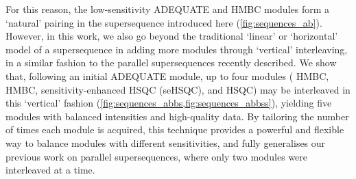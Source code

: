 \documentclass[a4paper,12pt]{article}
\newcommand{\carbon}{\ch{^{13}C}}
\newcommand{\nitrogen}{\ch{^{15}N}}
\begin{document}
\begin{refsection}
For this reason, the low-sensitivity ADEQUATE and \nitrogen{} HMBC modules form a `natural' pairing in the  supersequence introduced here (\cref{fig:sequences_ab}).
However, in this work, we also go beyond the traditional `linear' or `horizontal' model of a supersequence in adding more modules through `vertical' interleaving, in a similar fashion to the parallel supersequences recently described.\autocite{Kupce2021JACSA}
We show that, following an initial ADEQUATE module, up to four modules (\nitrogen{} HMBC, \carbon{} HMBC, \nitrogen{} sensitivity-enhanced HSQC (seHSQC), and \carbon{} HSQC) may be interleaved in this `vertical' fashion (\cref{fig:sequences_abbs,fig:sequences_abbss}), yielding five modules with balanced intensities and high-quality data.
By tailoring the number of times each module is acquired, this technique provides a powerful and flexible way to balance modules with different sensitivities, and fully generalises our previous work on parallel supersequences, where only two modules were interleaved at a time.


\end{refsection}
\end{document}
